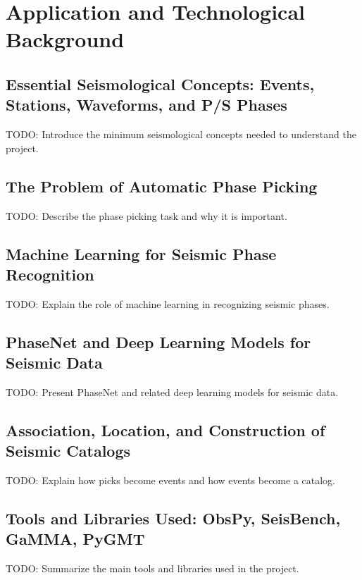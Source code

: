\chapter{Application and Technological Background}

\section{Essential Seismological Concepts: Events, Stations, Waveforms, and P/S Phases}
TODO: Introduce the minimum seismological concepts needed to understand the project.

\section{The Problem of Automatic Phase Picking}
TODO: Describe the phase picking task and why it is important.

\section{Machine Learning for Seismic Phase Recognition}
TODO: Explain the role of machine learning in recognizing seismic phases.

\section{PhaseNet and Deep Learning Models for Seismic Data}
TODO: Present PhaseNet and related deep learning models for seismic data.

\section{Association, Location, and Construction of Seismic Catalogs}
TODO: Explain how picks become events and how events become a catalog.

\section{Tools and Libraries Used: ObsPy, SeisBench, GaMMA, PyGMT}
TODO: Summarize the main tools and libraries used in the project.
